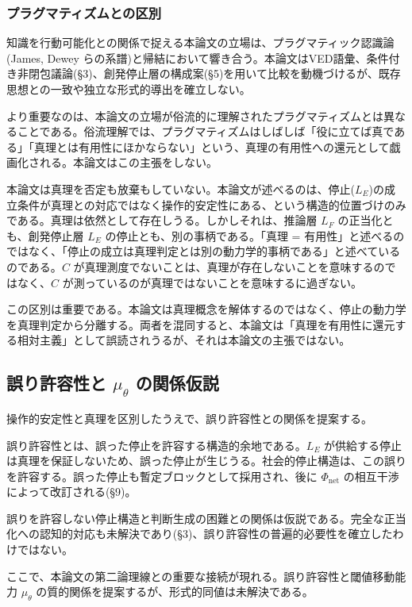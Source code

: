 \subsubsection{プラグマティズムとの区別}


知識を行動可能化との関係で捉える本論文の立場は、プラグマティック認識論(James, Dewey らの系譜)と帰結において響き合う。本論文はVED語彙、条件付き非閉包議論(\S{}3)、創発停止層の構成案(\S{}5)を用いて比較を動機づけるが、既存思想との一致や独立な形式的導出を確立しない。

より重要なのは、本論文の立場が俗流的に理解されたプラグマティズムとは異なることである。俗流理解では、プラグマティズムはしばしば「役に立てば真である」「真理とは有用性にほかならない」という、真理の有用性への還元として戯画化される。本論文はこの主張をしない。

本論文は真理を否定も放棄もしていない。本論文が述べるのは、停止($L_E$)の成立条件が真理との対応ではなく操作的安定性にある、という構造的位置づけのみである。真理は依然として存在しうる。しかしそれは、推論層 $L_F$ の正当化とも、創発停止層 $L_E$ の停止とも、別の事柄である。「真理 = 有用性」と述べるのではなく、「停止の成立は真理判定とは別の動力学的事柄である」と述べているのである。$C$ が真理測度でないことは、真理が存在しないことを意味するのではなく、$C$ が測っているのが真理ではないことを意味するに過ぎない。

この区別は重要である。本論文は真理概念を解体するのではなく、停止の動力学を真理判定から分離する。両者を混同すると、本論文は「真理を有用性に還元する相対主義」として誤読されうるが、それは本論文の主張ではない。

\bigskip


\subsection{誤り許容性と $\mu_\theta$ の関係仮説}


操作的安定性と真理を区別したうえで、誤り許容性との関係を提案する。

誤り許容性とは、誤った停止を許容する構造的余地である。$L_E$ が供給する停止は真理を保証しないため、誤った停止が生じうる。社会的停止構造は、この誤りを許容する。誤った停止も暫定ブロックとして採用され、後に $\Phi_{\text{net}}$ の相互干渉によって改訂される(\S{}9)。

誤りを許容しない停止構造と判断生成の困難との関係は仮説である。完全な正当化への認知的対応も未解決であり(\S{}3)、誤り許容性の普遍的必要性を確立したわけではない。

ここで、本論文の第二論理線との重要な接続が現れる。誤り許容性と閾値移動能力 $\mu_\theta$ の質的関係を提案するが、形式的同値は未解決である。

